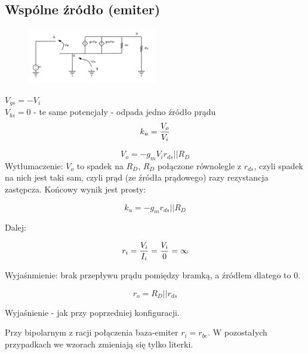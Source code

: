 \documentclass[10pt,a4paper]{article}
\begin{document}
\subsection{Wspólne źródło (emiter)}


\begin{figure}[H]
\centering
\includegraphics[width=0.5\textwidth]{CS}
\end{figure}

$V_{gs} = -V_i$\\
$V_{bs} = 0$ - te same potencjały - odpada jedno źródło prądu\\

\begin{equation}
k_u = {V_o \over V_i}
\end{equation}

\begin{equation}
V_o = -g_mV_i{r_{ds}||R_D}
\end{equation}
Wytłumaczenie: $V_o$ to spadek na $R_D$, $R_D$ połączone równolegle z $r_{ds}$, czyli spadek na nich jest taki sam, czyli prąd (ze źródła prądowego) razy rezystancja zastępcza. Końcowy wynik jest prosty:

\begin{equation}
k_u = -g_m{r_{ds}||R_D}
\end{equation}

Dalej:

\begin{equation}
r_i = {V_i \over I_i} = {V_i \over 0} = \infty
\end{equation}

Wyjaśnmienie: brak przepływu prądu pomiędzy bramką, a źródłem dlatego to 0.

\begin{equation}
r_o = R_D || r_{ds}
\end{equation}

Wyjaśnienie - jak przy poprzedniej konfiguracji.

Przy bipolarnym z racji połączenia baza-emiter $r_i = r_{be}$. W pozostałych przypadkach we wzorach zmieniają się tylko literki.
\end{document}
